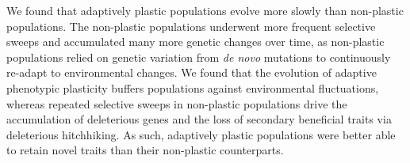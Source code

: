 We found that adaptively plastic populations evolve more slowly than non-plastic populations. 
The non-plastic populations underwent more frequent selective sweeps and accumulated many more genetic changes over time, as non-plastic populations relied on genetic variation from \textit{de novo} mutations to continuously re-adapt to environmental changes. 
We found that the evolution of adaptive phenotypic plasticity buffers populations against environmental fluctuations, whereas repeated selective sweeps in non-plastic populations drive the accumulation of deleterious genes and the loss of secondary beneficial traits via deleterious hitchhiking.
As such, adaptively plastic populations were better able to retain novel traits than their non-plastic counterparts.

